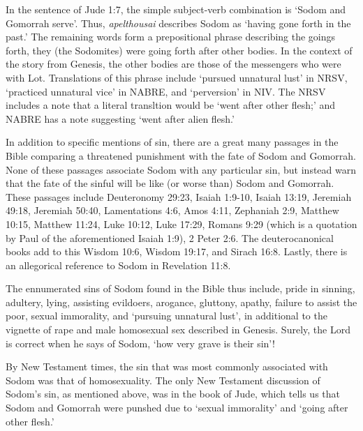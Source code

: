 \documentclass[10pt]{article}
\begin{document}
In the sentence of Jude 1:7, the simple subject-verb combination is `Sodom and Gomorrah serve'. Thus, \textit{apelthousai} describes Sodom as `having gone forth in the past.' The remaining words form a prepositional phrase describing the goings forth, they (the Sodomites) were going forth after other bodies. In the context of the story from Genesis, the other bodies are those of the messengers who were with Lot. Translations of this phrase include `pursued unnatural lust' in NRSV, `practiced unnatural vice' in NABRE, and `perversion' in NIV. The NRSV includes a note that a literal transltion would be `went after other flesh;' and NABRE has a note suggesting `went after alien flesh.' 

In addition to specific mentions of sin, there are a great many passages in the Bible comparing a threatened punishment with the fate of Sodom and Gomorrah. None of these passages associate Sodom with any particular sin, but instead warn that the fate of the sinful will be like (or worse than) Sodom and Gomorrah. These passages include Deuteronomy 29:23, Isaiah 1:9-10, Isaiah 13:19, Jeremiah 49:18, Jeremiah 50:40, Lamentations 4:6, Amos 4:11, Zephaniah 2:9, Matthew 10:15, Matthew 11:24, Luke 10:12, Luke 17:29, Romans 9:29 (which is a quotation by Paul of the aforementioned Isaiah 1:9), 2 Peter 2:6. The deuterocanonical books add to this Wisdom 10:6, Wisdom 19:17, and Sirach 16:8. Lastly, there is an allegorical reference to Sodom in Revelation 11:8. 

The ennumerated sins of Sodom found in the Bible thus include, pride in sinning, adultery, lying, assisting evildoers, arogance, gluttony, apathy, failure to assist the poor, sexual immorality, and `pursuing unnatural lust', in additional to the vignette of rape and male homosexual sex described in Genesis. Surely, the Lord is correct when he says of Sodom, `how very grave is their sin'!

By New Testament times, the sin that was most commonly associated with Sodom was that of homosexuality. The only New Testament discussion of Sodom's sin, as mentioned above, was in the book of Jude, which tells us that Sodom and Gomorrah were punshed due to `sexual immorality' and `going after other flesh.' 
\end{document}
